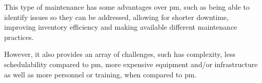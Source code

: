 This type of maintenance has some advantages over \acrshort{pm}, such as being able to identify issues so they can be addressed, allowing for shorter downtime, improving inventory efficiency and making available different maintenance practices.

However, it also provides an array of challenges, such has complexity, less schedulability compared to \acrshort{pm}, more expensive equipment and/or infrastructure as well as more personnel or training, when compared to \acrshort{pm}.




